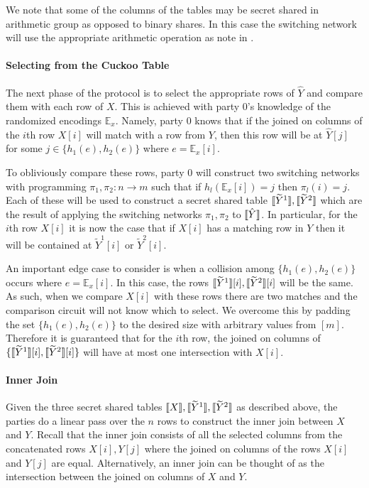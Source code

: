 We note that some of the columns of the tables may be secret shared in arithmetic group as opposed to binary shares. In this case the switching network will use the appropriate arithmetic operation as note in . 

\paragraph{Selecting from the Cuckoo Table}

The next phase of the protocol is to select the appropriate rows of $\hat Y$ and compare them with each row of $X$. This is achieved with party 0's knowledge of the randomized encodings $\mathbb{E}_x$. Namely, party 0 knows that if the joined on columns of the $i$th row $X[i]$ will match with a row from $Y$, then this row will be at $\hat Y[j]$ for some $j\in \{h_1(e),h_2(e)\}$ where  $e=\mathbb{E}_x[i]$. 

To obliviously compare these rows, party 0 will construct two switching networks with programming $\pi_1,\pi_2 : n\rightarrow m$ such that if $h_l(\mathbb{E}_x[i])=j$ then $\pi_l(i)=j$. Each of these will be used to construct a secret shared table $\llbracket \widetilde{Y}^1\rrbracket,\llbracket \widetilde{Y}^2\rrbracket$ which are the result of applying the switching networks $\pi_1,\pi_2$ to $\llbracket \hat Y\rrbracket$. In particular, for the $i$th row $X[i]$ it is now the case that if $X[i]$ has a matching row in $Y$ then it will be contained at  $\widetilde{Y}^1[i]$ or $\widetilde{Y}^2[i]$. 

An important edge case to consider is when a collision among $\{h_1(e),h_2(e)\}$ occurs where $e= \mathbb{E}_x[i]$. In this case, the rows $\llbracket \widetilde{Y}^1\rrbracket[i],\llbracket \widetilde{Y}^2\rrbracket[i]$ will be the same. As such, when we compare $X[i]$ with these rows there are two matches and the comparison circuit will not know which to select. We overcome this by padding the set $\{h_1(e),h_2(e)\}$ to the desired size with arbitrary values from $[m]$. Therefore it is guaranteed that for the $i$th row, the joined on columns of $\{\llbracket \widetilde{Y}^1\rrbracket[i],\llbracket \widetilde{Y}^2\rrbracket[i]\}$ will  have at most one intersection with $X[i]$.


\paragraph{Inner Join}

Given the three secret shared tables $\llbracket X\rrbracket,\llbracket \widetilde{Y}^1\rrbracket,\llbracket \widetilde{Y}^2\rrbracket$ as described above, the parties do a linear pass over the $n$ rows to construct the inner join between $X$ and $Y$. Recall that the inner join consists of all the selected columns from the concatenated rows $X[i],Y[j]$ where  the joined on columns of the rows $X[i]$ and $Y[j]$ are equal. Alternatively, an inner join can be thought of as the intersection between the joined on columns of $X$ and $Y$. 

